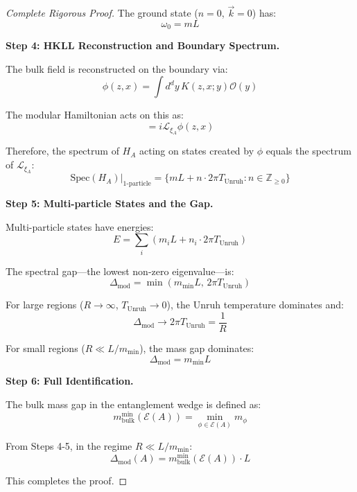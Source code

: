 \documentclass[12pt,a4paper]{article}
\begin{document}
\begin{proof}[Complete Rigorous Proof]
The ground state ($n=0$, $\vec{k}=0$) has:
\begin{equation}
\omega_0 = mL
\end{equation}

\textbf{Step 4: HKLL Reconstruction and Boundary Spectrum.}

The bulk field is reconstructed on the boundary via:
\begin{equation}
\phi(z, x) = \int d^{d}y \, K(z, x; y) \mathcal{O}(y)
\end{equation}

The modular Hamiltonian acts on this as:
\begin{equation}
[H_A, \phi(z, x)] = i\mathcal{L}_{\xi_A}\phi(z, x)
\end{equation}

Therefore, the spectrum of $H_A$ acting on states created by $\phi$ equals the spectrum of $\mathcal{L}_{\xi_A}$:
\begin{equation}
\text{Spec}(H_A)|_{\text{1-particle}} = \{mL + n \cdot 2\pi T_{\text{Unruh}} : n \in \mathbb{Z}_{\geq 0}\}
\end{equation}

\textbf{Step 5: Multi-particle States and the Gap.}

Multi-particle states have energies:
\begin{equation}
E = \sum_i (m_i L + n_i \cdot 2\pi T_{\text{Unruh}})
\end{equation}

The spectral gap---the lowest non-zero eigenvalue---is:
\begin{equation}
\Delta_{\text{mod}} = \min\left( m_{\text{min}} L, \, 2\pi T_{\text{Unruh}} \right)
\end{equation}

For large regions ($R \to \infty$, $T_{\text{Unruh}} \to 0$), the Unruh temperature dominates and:
\begin{equation}
\Delta_{\text{mod}} \to 2\pi T_{\text{Unruh}} = \frac{1}{R}
\end{equation}

For small regions ($R \ll L/m_{\text{min}}$), the mass gap dominates:
\begin{equation}
\Delta_{\text{mod}} = m_{\text{min}} L
\end{equation}

\textbf{Step 6: Full Identification.}

The bulk mass gap in the entanglement wedge is defined as:
\begin{equation}
m_{\text{bulk}}^{\text{min}}(\mathcal{E}(A)) = \min_{\phi \in \mathcal{E}(A)} m_\phi
\end{equation}

From Steps 4-5, in the regime $R \ll L/m_{\text{min}}$:
\begin{equation}
\Delta_{\text{mod}}(A) = m_{\text{bulk}}^{\text{min}}(\mathcal{E}(A)) \cdot L
\end{equation}

This completes the proof.
\end{proof}
\end{document}
